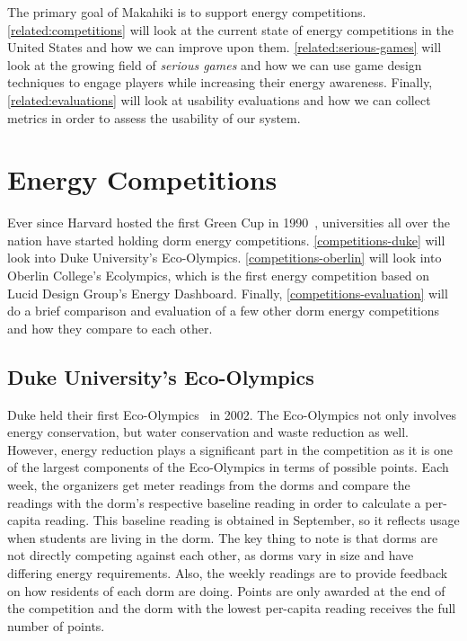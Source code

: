 The primary goal of Makahiki is to support energy competitions. \autoref{related:competitions} will look at the current state of energy competitions in the United States and how we can improve upon them. \autoref{related:serious-games} will look at the growing field of \emph{serious games} and how we can use game design techniques to engage players while increasing their energy awareness. Finally, \autoref{related:evaluations} will look at usability evaluations and how we can collect metrics in order to assess the usability of our system.

\section{Energy Competitions}
\label{related:competitions}

Ever since Harvard hosted the first Green Cup in 1990~\cite{harvard-greencup}, universities all over the nation have started holding dorm energy competitions. \autoref{competitions-duke} will look into Duke University's Eco-Olympics.  \autoref{competitions-oberlin} will look into Oberlin College's Ecolympics, which is the first energy competition based on Lucid Design Group's Energy Dashboard. Finally, \autoref{competitions-evaluation} will do a brief comparison and evaluation of a few other dorm energy competitions and how they compare to each other.

\subsection{Duke University's Eco-Olympics}
\label{competitions-duke}

Duke held their first Eco-Olympics~\cite{duke-eco-olympics} in 2002.  The Eco-Olympics not only involves energy conservation, but water conservation and waste reduction as well.  However, energy reduction plays a significant part in the competition as it is one of the largest components of the Eco-Olympics in terms of possible points.  Each week, the organizers get meter readings from the dorms and compare the readings with the dorm's respective baseline reading in order to calculate a per-capita reading.  This baseline reading is obtained in September, so it reflects usage when students are living in the dorm.   The key thing to note is that dorms are not directly competing against each other, as dorms vary in size and have differing energy requirements.  Also, the weekly readings are to provide feedback on how residents of each dorm are doing.  Points are only awarded at the end of the competition and the dorm with the lowest per-capita reading receives the full number of points.

